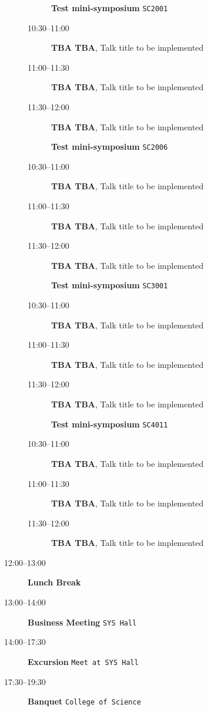\documentclass[ILAS2025-program.tex]{subfiles}
\begin{document}
\begin{description}
    \begin{description}
    \item[] \textbf{Test mini-symposium} {\footnotesize\texttt{SC2001}}
    \item[10:30--11:00] \textbf{TBA TBA}, Talk title to be implemented
        \item[11:00--11:30] \textbf{TBA TBA}, Talk title to be implemented
        \item[11:30--12:00] \textbf{TBA TBA}, Talk title to be implemented
        \end{description}
    \begin{description}
    \item[] \textbf{Test mini-symposium} {\footnotesize\texttt{SC2006}}
    \item[10:30--11:00] \textbf{TBA TBA}, Talk title to be implemented
        \item[11:00--11:30] \textbf{TBA TBA}, Talk title to be implemented
        \item[11:30--12:00] \textbf{TBA TBA}, Talk title to be implemented
        \end{description}
    \begin{description}
    \item[] \textbf{Test mini-symposium} {\footnotesize\texttt{SC3001}}
    \item[10:30--11:00] \textbf{TBA TBA}, Talk title to be implemented
        \item[11:00--11:30] \textbf{TBA TBA}, Talk title to be implemented
        \item[11:30--12:00] \textbf{TBA TBA}, Talk title to be implemented
        \end{description}
    \begin{description}
    \item[] \textbf{Test mini-symposium} {\footnotesize\texttt{SC4011}}
    \item[10:30--11:00] \textbf{TBA TBA}, Talk title to be implemented
        \item[11:00--11:30] \textbf{TBA TBA}, Talk title to be implemented
        \item[11:30--12:00] \textbf{TBA TBA}, Talk title to be implemented
        \end{description}
    \item[12:00--13:00] \textbf{Lunch Break} {\footnotesize\texttt{}}
    \item[13:00--14:00] \textbf{Business Meeting} {\footnotesize\texttt{SYS Hall}}
    \item[14:00--17:30] \textbf{Excursion} {\footnotesize\texttt{Meet at SYS Hall}}
    \item[17:30--19:30] \textbf{Banquet} {\footnotesize\texttt{College of Science}}
    \end{description}
    \newpage
\end{document}
